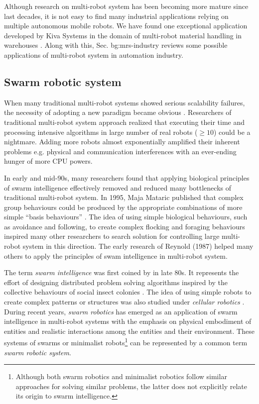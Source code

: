 Although research on multi-robot system has been becoming more mature since last decades, it is not easy to find many industrial applications relying on multiple autonomous mobile robots. We have found one exceptional application developed by Kiva Systems in the domain of multi-robot material handling in warehouses \cite{Wurman+2008}. Along with this, Sec. {bg:mrs-industry} reviews some possible applications of multi-robot system in automation industry.
\subsection{Swarm robotic system}
\label{bg:mrs:srs}
When many traditional multi-robot systems showed serious  scalability failures, the necessity of adopting a  new paradigm became obvious \cite{Lerman+2006}. Researchers of traditional multi-robot system approach realized  that  executing their time and processing intensive algorithms in large number of real robots ($\geq 10$) could be a nightmare. Adding more robots almost exponentially amplified their inherent  problems e.g. physical and communication interferences with an ever-ending hunger of more CPU powers. 

In early and mid-90s, many researchers found that applying biological principles of swarm intelligence effectively removed and reduced many bottlenecks of traditional multi-robot system.  In 1995, Maja Mataric published that complex group behaviours could be produced by the appropriate combinations of more simple ``basis behaviours'' \cite{Mataric1995}. The idea of using simple biological behaviours, such as avoidance and following, to create complex flocking and foraging behaviours inspired many other researchers to search solution for controlling large multi-robot system in this direction.  The early research of Reynold (1987) helped many others to apply the principles of swam intelligence in multi-robot system. 

The term {\em swarm intelligence} was first coined by   in late 80s. It represents the effort of designing distributed problem solving algorithms inspired by the collective behaviours of social insect colonies \cite{Bonabeau+1999}. The idea of using simple robots to create complex patterns or structures was also studied under {\em cellular robotics} \cite{Fukuda+1987}. During recent years, {\em swarm robotics} has emerged as an application of swarm intelligence in multi-robot systems with the emphasis on physical embodiment of entities and realistic interactions among the entities and their environment. These systems of swarms or minimalist robots\footnote{Although both swarm robotics and minimalist robotics follow similar approaches for solving similar problems, the latter does not explicitly relate its origin to swarm intelligence.} can be represented by a common term {\em swarm robotic system}.

